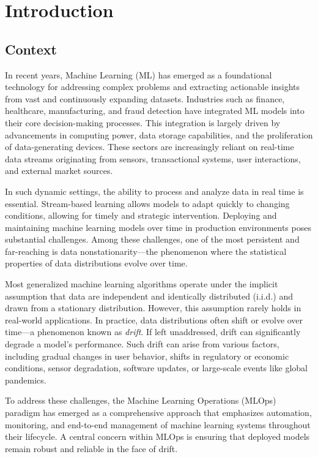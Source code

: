 \chapter{Introduction}\label{ch:introduction}

\section{Context}\label{sec:context}
In recent years, Machine Learning (ML) has emerged as a foundational technology
for addressing complex problems and extracting actionable insights from vast
and continuously expanding datasets. Industries such as finance, healthcare,
manufacturing, and fraud detection have integrated ML models into their core
decision-making processes. This integration is largely driven by advancements
in computing power, data storage capabilities, and the proliferation of
data-generating devices. These sectors are increasingly reliant on real-time
data streams originating from sensors, transactional systems, user
interactions, and external market sources.

In such dynamic settings, the ability to process and analyze data in real time
is essential. Stream-based learning allows models to adapt quickly to changing
conditions, allowing for timely and strategic intervention. Deploying and
maintaining machine learning models over time in production environments poses
substantial challenges. Among these challenges, one of the most persistent and
far-reaching is data nonstationarity—the phenomenon where the statistical
properties of data distributions evolve over time.

Most generalized machine learning algorithms operate under the implicit
assumption that data are independent and identically distributed (i.i.d.) and
drawn from a stationary distribution. However, this assumption rarely holds in
real-world applications. In practice, data distributions often shift or evolve
over time—a phenomenon known as \emph{drift}. If left unaddressed, drift can
significantly degrade a model's performance. Such drift can arise from various
factors, including gradual changes in user behavior, shifts in regulatory or
economic conditions, sensor degradation, software updates, or large-scale
events like global pandemics.

To address these challenges, the Machine Learning Operations
(MLOps)~\cite{mlops} paradigm has emerged as a comprehensive approach that
emphasizes automation, monitoring, and end-to-end management of machine
learning systems throughout their lifecycle. A central concern within MLOps is
ensuring that deployed models remain robust and reliable in the face of drift.

